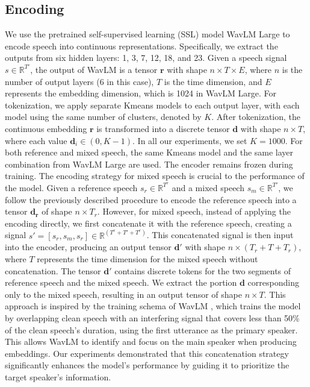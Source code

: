 \documentclass[conference]{IEEEtran}
\begin{document}
\subsection{Encoding}




We use the pretrained self-supervised learning (SSL) model WavLM Large \cite{wavlm} to encode speech into continuous representations. Specifically, we extract the outputs from six hidden layers: 1, 3, 7, 12, 18, and 23. Given a speech signal \(s \in \mathbb{R}^{T'}\), the output of WavLM is a tensor \(\bm{r}\) with shape \(n \times T \times E\), where \(n\) is the number of output layers (6 in this case), \(T\) is the time dimension, and \(E\) represents the embedding dimension, which is 1024 in WavLM Large.  For tokenization, we apply separate Kmeans models to each output layer, with each model using the same number of clusters, denoted by \(K\). After tokenization, the continuous embedding \(\bm{r}\) is transformed into a discrete tensor \(\bm{d}\) with shape \(n \times T\), where each value \(\bm{d}_{i} \in (0, K-1) \). In all our experiments, we set \(K = 1000\). For both reference and mixed speech, the same Kmeans model and the same layer combination from WavLM Large are used. The encoder remains frozen during training.
The encoding strategy for mixed speech is crucial to the performance of the model. Given a reference speech \(s_r \in \mathbb{R}^{T^r}\) and a mixed speech \(s_m \in \mathbb{R}^{T'}\), we follow the previously described procedure to encode the reference speech into a tensor \(\bm{d_r}\) of shape \(n \times T_r\). However, for mixed speech, instead of applying the encoding directly, we first concatenate it with the reference speech, creating a signal \(s' = [s_r, s_m, s_r] \in \mathbb{R}^{(T^r + T' + T^r)}\). This concatenated signal is then input into the encoder, producing an output tensor \(\bm{d'}\) with shape \(n \times (T_r + T + T_r)\), where \(T\) represents the time dimension for the mixed speech without concatenation. The tensor \(\bm{d'}\) contains discrete tokens for the two segments of reference speech and the mixed speech. We extract the portion \(\bm{d}\) corresponding only to the mixed speech, resulting in an output tensor of shape \(n \times T\).
This approach is inspired by the training schema of WavLM \cite{wavlm}, which trains the model by overlapping clean speech with an interfering signal that covers less than 50\% of the clean speech's duration, using the first utterance as the primary speaker. This allows WavLM to identify and focus on the main speaker when producing embeddings. Our experiments demonstrated that this concatenation strategy significantly enhances the model's performance by guiding it to prioritize the target speaker's information.
\end{document}
